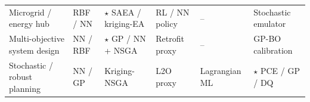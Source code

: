 \begin{table}[!t]
\begin{tabularx}{\textwidth}{@{}L{0.14\textwidth} L{0.17\textwidth} L{0.17\textwidth} L{0.17\textwidth} L{0.15\textwidth} L{0.15\textwidth}@{}}
    Microgrid / energy hub
      & RBF / NN \cite{Wang2017,Hussien20211883,Li2023__3}
      & $\star$ SAEA / kriging-EA \cite{Deng2020831,Pang2023}
      & RL / NN policy \cite{Chaturvedi2024149,Hussien20226442}
      & --
      & Stochastic emulator \cite{Liang20222192,Khalid20241959} \\
    Multi-objective system design
      & NN / RBF \cite{Hirvonen2017323,Wang2017,Schulte2020}
      & $\star$ GP / NN + NSGA \cite{Roth2019214,Han2018622,Aghaei Pour2022303,Reis2025}
      & Retrofit proxy \cite{Thrampoulidis2021}
      & --
      & GP-BO calibration \cite{Chakrabarty2021} \\
    Stochastic / robust planning
      & NN / GP \cite{Lawson201647,Liu20222679,Hu2020}
      & Kriging-NSGA \cite{Lin2023,Pang2023}
      & L2O proxy \cite{Liang20246508}
      & Lagrangian ML \cite{Wu2024391}
      & $\star$ PCE / GP / DQ \cite{Muhlpfordt20194806,Safta20172535,Lu201991827,Chen2023657} \\
    \bottomrule
  \end{tabularx}
\end{table}
